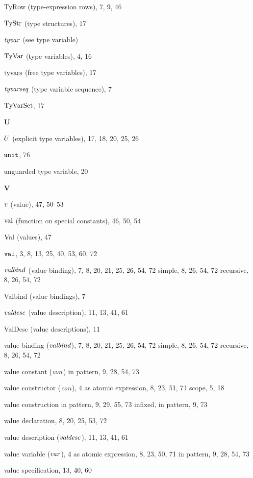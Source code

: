 \begin{theindex}
\item TyRow (type-expression rows), 7, 9, 46
\item ${\rm TyStr}$ (type structures), 17
\item ${\it tyvar}$ (see type variable) 
\item ${\rm TyVar}$ (type variables), 4, 16
\item $\mathop{\rm tyvars}\nolimits$ (free type variables), 17
\item ${\it tyvarseq}$ (type variable sequence), 7
\item ${\rm TyVarSet}$, 17
\indexspace
\parbox{65mm}{\hfil{\large\bf U}\hfil}
\indexspace
\item $U$ (explicit type variables), 17, 18, 20, 25, 26
\item $\mbox{\tt unit}$, 76
\item unguarded type variable, 20
\indexspace
\parbox{65mm}{\hfil{\large\bf V}\hfil}
\indexspace
\item $v$ (value), 47, 50--53
\item $\mathop{\rm val}\nolimits$ (function on special constants), 46, 50, 54
\item ${\rm Val}$ (values), 47
\item ${\tt val}$, 3, 8, 13, 25, 40, 53, 60, 72
\item ${\it valbind}$ (value binding), 7, 8, 20, 21, 25, 26, 54, 72
\subitem simple, 8, 26, 54, 72
\subitem recursive, 8, 26, 54, 72
\item Valbind (value bindings), 7
\item ${\it valdesc}$ (value description), 11, 13, 41, 61
\item ValDesc (value descriptions), 11
\item value binding (${\it valbind}$), 7, 8, 20, 21, 25, 26, 54, 72
\subitem simple, 8, 26, 54, 72
\subitem recursive, 8, 26, 54, 72
\item value constant (${\it con}$) 
\subitem in pattern, 9, 28, 54, 73
\item value constructor (${\it con}$), 4
\subitem as atomic expression, 8, 23, 51, 71
\subitem scope, 5, 18
\item value construction 
\subitem in pattern, 9, 29, 55, 73
\subitem infixed, in pattern, 9, 73
\item value declaration, 8, 20, 25, 53, 72
\item value description (${\it valdesc}$), 11, 13, 41, 61
\item value variable (${\it var}$), 4
\subitem as atomic expression, 8, 23, 50, 71
\subitem in pattern, 9, 28, 54, 73
\item value specification, 13, 40, 60

\end{theindex}
